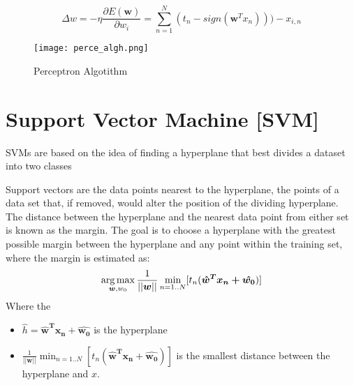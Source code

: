 \[\Delta w=-\eta \frac{\partial E(\bm{w}) }{\partial w_i}=\sum_{n=1}^N(t_n-sign(\bm{w}^Tx_n)))-x_{i,n} \]

\begin{figure}[H]
\texttt{[image: perce\_algh.png]}
\caption{Perceptron Algotithm}
\end{figure}

\section{Support Vector Machine [SVM]}
SVMs are based on the idea of finding a hyperplane that best divides a dataset into two classes


\begin{figure}[H]
    \centering
    \qquad

\label{fig:linear_problem}%
\end{figure}

Support vectors are the data points nearest to the hyperplane, the points of a data set that, if removed, would alter the position of the dividing hyperplane.\\
The distance between the hyperplane and the nearest data point from either set is known as the margin. The goal is to choose a hyperplane with the greatest possible margin between the hyperplane and any point within the training set, where the margin is estimated as:
\[\operatorname*{arg\,max}_{\bm{w},w_0}\frac{1}{||\bm{w}||}\min_{n=1..N}[t_n(\bm{\hat{w}^Tx_n+\hat{w_0}})]\]
Where the
\begin{itemize}
\item $\hat{h}=\bm{\hat{w}^Tx_n+\hat{w_0}}$ is the hyperplane
\item $\frac{1}{||\bm{w}||}\min_{n=1..N}[t_n(\bm{\hat{w}^Tx_n+\hat{w_0}})]$ is the smallest distance between the hyperplane and $x$.

\end{itemize}
 

